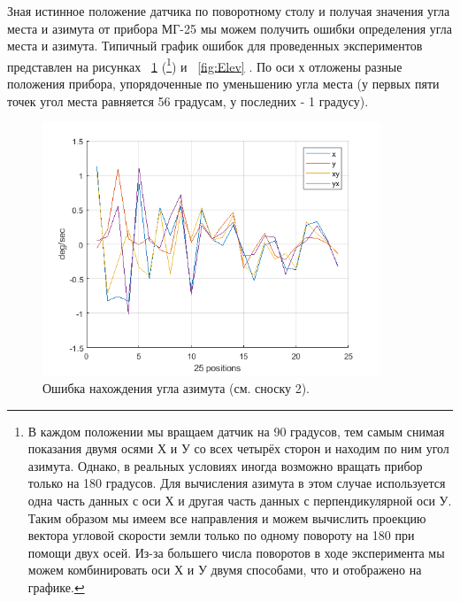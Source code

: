 \documentclass[a4paper,12pt]{article}
\begin{document}
Зная истинное положение датчика по поворотному столу и получая значения угла места и азимута от прибора МГ-25 мы можем получить ошибки определения угла места и азимута. Типичный график ошибок для проведенных экспериментов представлен на рисунках ~\ref{fig:Azim} (\footnote{В каждом положении мы вращаем датчик на 90 градусов, тем самым снимая показания двумя осями Х и У со всех четырёх сторон и находим по ним угол азимута. Однако, в реальных условиях иногда возможно вращать прибор только на 180 градусов. Для вычисления азимута в этом случае используется одна часть данных с оси Х и другая часть данных с перпендикулярной оси У. Таким образом мы имеем все направления и можем вычислить проекцию вектора угловой скорости земли только по одному повороту на 180 при помощи двух осей. Из-за большего числа поворотов в ходе эксперимента мы можем комбинировать оси Х и У двумя способами, что и отображено на графике. }) и ~\ref{fig:Elev} . По оси х отложены разные положения прибора, упорядоченные по уменьшению угла места (у первых пяти точек угол места равняется 56 градусам, у последних - 1 градусу).

\begin{figure}[h!] 
\centering
\includegraphics[width=0.9\textwidth]{Azim_err.png} 
\caption{\label{fig:Azim} Ошибка нахождения угла азимута (см. сноску 2).}
\end{figure}
\end{document}
